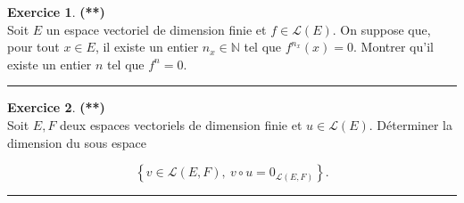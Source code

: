\documentclass[a4paper,11pt]{article}
\theoremstyle{definition}
\newtheorem{exo}{Exercice} %
\begin{document}
\begin{minipage}{1\linewidth}
\begin{minipage}[t]{0.48\linewidth}
		\begin{exo}\textbf{(**)}\quad\\[0.2cm]
			Soit $E$ un espace vectoriel de dimension finie et $f\in\mathcal L(E)$.
			On suppose que, pour tout $x\in E$, il existe un entier $n_x\in\mathbb N$ tel
			que $f^{n_x}(x)=0.$ Montrer qu'il existe un entier $n$ tel que $f^n=0$.
	
			\centering\rule{1\linewidth}{0.6pt}\end{exo}
		
		
		
		\begin{exo}\textbf{(**)}\quad\\[0.2cm]
			Soit $E, F$ deux espaces vectoriels de dimension finie et $u \in \mathscr{L}(E)$. Déterminer la dimension du sous espace
			
			$$
			\left\{v \in \mathscr{L}(E, F), \ v \circ u=0_{\mathscr{L}(E, F)}\right\} .
			$$
			
			\centering\rule{1\linewidth}{0.6pt}\end{exo}
		
		
		
\end{minipage}\end{minipage} \newpage
\end{document}
